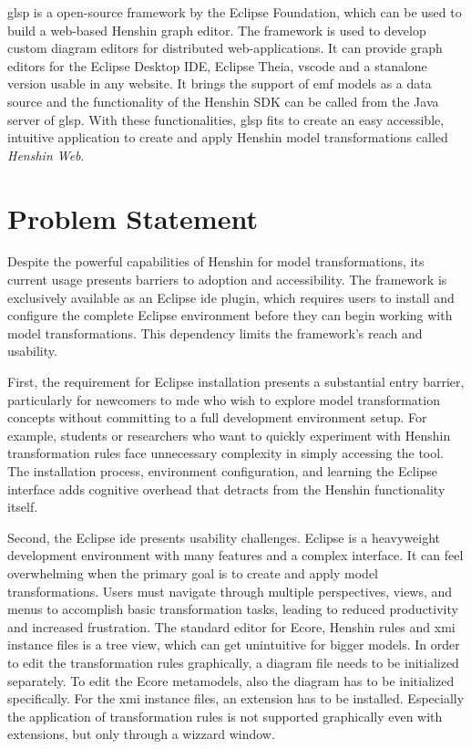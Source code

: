 \ac{glsp} is a open-source framework by the Eclipse Foundation, which can be used to build a web-based Henshin graph editor. The framework is used to develop custom diagram editors for distributed web-applications. \cite{glsp-repo} It can provide graph editors for the Eclipse Desktop IDE, Eclipse Theia, \ac{vscode} and a stanalone version usable in any website. It brings the support of \ac{emf} models as a data source and the functionality of the Henshin SDK can be called from the Java server of \ac{glsp}. \cite{glsp-doc} With these functionalities, \ac{glsp} fits to create an easy accessible, intuitive application to create and apply Henshin model transformations called \textit{Henshin Web}.

\section{Problem Statement}
\label{subsec:problem-statement}

Despite the powerful capabilities of Henshin for model transformations, its current usage presents barriers to adoption and accessibility. The framework is exclusively available as an Eclipse \ac{ide} plugin, which requires users to install and configure the complete Eclipse environment before they can begin working with model transformations. This dependency limits the framework's reach and usability.

First, the requirement for Eclipse installation presents a substantial entry barrier, particularly for newcomers to \ac{mde} who wish to explore model transformation concepts without committing to a full development environment setup. For example, students or researchers who want to quickly experiment with Henshin transformation rules face unnecessary complexity in simply accessing the tool. The installation process, environment configuration, and learning the Eclipse interface adds cognitive overhead that detracts from the Henshin functionality itself.

Second, the Eclipse \ac{ide} presents usability challenges. Eclipse is a heavyweight development environment with many features and a complex interface. It can feel overwhelming when the primary goal is to create and apply model transformations. Users must navigate through multiple perspectives, views, and menus to accomplish basic transformation tasks, leading to reduced productivity and increased frustration.
The standard editor for Ecore, Henshin rules and \ac{xmi} instance files is a tree view, which can get unintuitive for bigger models. In order to edit the transformation rules graphically, a diagram file needs to be initialized separately. To edit the Ecore metamodels, also the diagram has to be initialized specifically. For the \ac{xmi} instance files, an extension has to be installed. Especially the application of transformation rules is not supported graphically even with extensions, but only through a wizzard window.  


